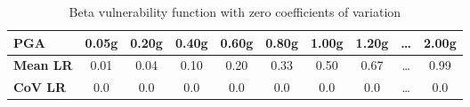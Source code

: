 \begin{table}[htbp]

\centering
\begin{tabular}{ l c c c c c c c c c }

\hline
\rowcolor{anti-flashwhite}
\bf{PGA} & \bf{0.05g} & \bf{0.20g} & \bf{0.40g} & \bf{0.60g} & \bf{0.80g} & \bf{1.00g} & \bf{1.20g} & \bf{\dots} & \bf{2.00g} \\
\hline
\bf{Mean LR} & 0.01 & 0.04 & 0.10 & 0.20 & 0.33 & 0.50 & 0.67 & \dots & 0.99 \\
\bf{CoV LR} & 0.0 & 0.0 & 0.0 & 0.0 & 0.0 & 0.0 & 0.0 & \dots & 0.0 \\
\hline
\end{tabular}

\caption{Beta vulnerability function with zero coefficients of variation}
\label{tab:vf-bt-tax1-zcov}
\end{table}